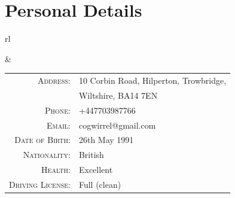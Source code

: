 \section*{Personal Details}

\begin{tabular}{rl}


&

\begin{tabular}{rl}
\textsc{Address:} & 10 Corbin Road, Hilperton, Trowbridge,\\
 & Wiltshire, BA14 7EN\\
\textsc{Phone:} & +447703987766\\
\textsc{Email:} & cogwirrel@gmail.com \\
\textsc{Date of Birth:} & 26th May 1991 \\
\textsc{Nationality:} & British \\
\textsc{Health:} & Excellent \\
\textsc{Driving License:} & Full (clean)
\end{tabular}

\end{tabular}